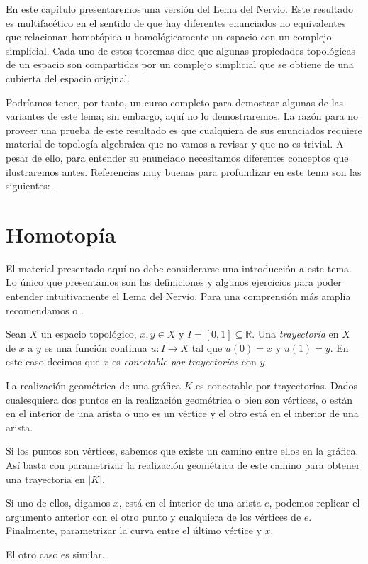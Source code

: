 \documentclass{standalone}
\begin{document}
	En este capítulo presentaremos una versión del Lema del Nervio. Este resultado es multifacético en el sentido de que hay diferentes enunciados no equivalentes que relacionan homotópica u homológicamente un espacio con un complejo simplicial. Cada uno de estos teoremas dice que algunas propiedades topológicas de un espacio son compartidas por un complejo simplicial  que se obtiene de una cubierta del espacio original.
	
	Podríamos tener, por tanto, un curso completo para demostrar algunas de las variantes de este lema; sin embargo, aquí no lo demostraremos. La razón para no proveer una prueba de este resultado es que cualquiera de sus enunciados requiere material de topología algebraica que no vamos a revisar y que no es trivial. A pesar de ello, para entender su enunciado necesitamos diferentes conceptos que ilustraremos antes. Referencias muy buenas para profundizar en este tema son las siguientes: \cite{dieck:2008:algebraic:topology,munkres:1984:algebraic:topology,rotman:1988:algebraic:topology}. 
	
	\section{Homotopía}
	El material presentado aquí no debe considerarse una introducción a este tema. Lo único que presentamos son las definiciones y algunos ejercicios para poder entender intuitivamente el Lema del Nervio. Para una comprensión más amplia recomendamos \cite{dieck:2008:algebraic:topology} o \cite{rotman:1988:algebraic:topology}.
	
	\begin{definition}\label{defn:path}
		Sean $X$ un espacio topológico, $x,y\in X$ y $I=[0,1]\subseteq\mathbb{R}$. Una \emph{trayectoria} en $X$ de $x$ a $y$ es una función continua $u\colon I\rightarrow X$ tal que $u(0)=x$ y $u(1)=y$. En este caso decimos que $x$ es \emph{conectable por trayectorias} con $y$
	\end{definition}
	
	\begin{example}
		La realización geométrica de una gráfica $K$ es conectable por trayectorias. Dados cualesquiera dos puntos en la realización geométrica o bien son vértices, o están en el interior de una arista o uno es un vértice y el otro está en el interior de una arista.
		
		Si los puntos son vértices, sabemos que existe un camino entre ellos en la gráfica. Así basta con parametrizar la realización geométrica de este camino para obtener una trayectoria en $|K|$.
		
		Si uno de ellos, digamos $x$, está en el interior de una arista $e$, podemos replicar el argumento anterior con el otro punto y cualquiera de los vértices de $e$. Finalmente, parametrizar la curva entre el último vértice y $x$.
		
		El otro caso es similar.
	\end{example}
	
\end{document}
